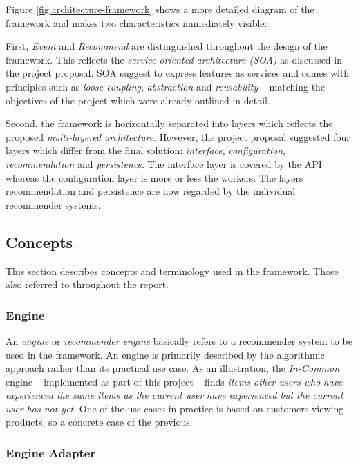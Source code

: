 Figure \ref{fig:architecture-framework} shows a more detailed diagram of the framework and makes two characteristics immediately visible:

First, \emph{Event} and \emph{Recommend} are distinguished throughout the design of the framework. This reflects the \emph{service-oriented architecture (SOA)} as discussed in the project proposal. SOA suggest to express features as services and comes with principles such as \emph{loose coupling}, \emph{abstraction} and \emph{reusability} -- matching the objectives of the project which were already outlined in detail.

Second, the framework is horizontally separated into layers which reflects the proposed \emph{multi-layered architecture}. However, the project proposal suggested four layers which differ from the final solution: \emph{interface}, \emph{configuration}, \emph{recommendation} and \emph{persistence}. The interface layer is covered by the API whereas the configuration layer is more or less the workers. The layers recommendation and persistence are now regarded by the individual recommender systems.

\subsection{Concepts}

This section describes concepts and terminology used in the framework. Those also referred to throughout the report.

\subsubsection{Engine}

An \emph{engine} or \emph{recommender engine} basically refers to a recommender system to be used in the framework. An engine is primarily described by the algorithmic approach rather than its practical use case. As an illustration, the \emph{In-Common} engine -- implemented as part of this project -- finds \emph{items other users who have experienced the same items as the current user have experienced but the current user has not yet}. One of the use cases in practice is based on customers viewing products, so a concrete case of the previous.

\subsubsection{Engine Adapter}

